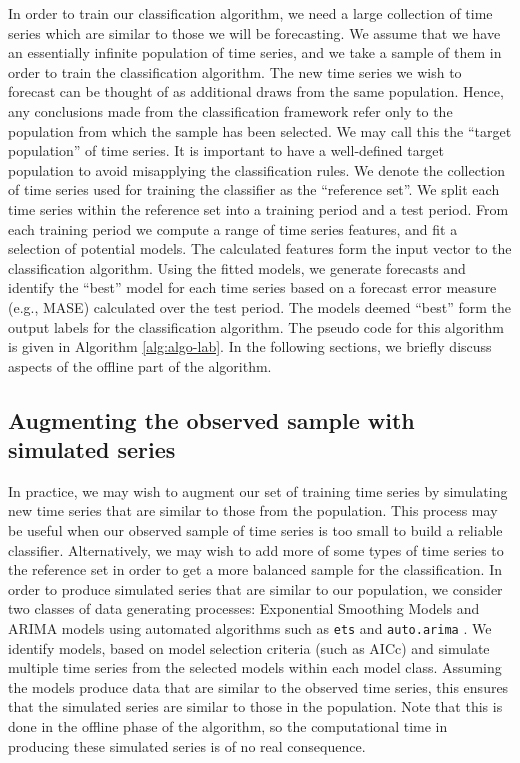 \documentclass[11pt,a4paper,]{article}
\theoremstyle{definition}
\theoremstyle{definition}
\theoremstyle{definition}
\theoremstyle{remark}
\begin{document}
In order to train our classification algorithm, we need a large
collection of time series which are similar to those we will be
forecasting. We assume that we have an essentially infinite population
of time series, and we take a sample of them in order to train the
classification algorithm. The new time series we wish to forecast can be
thought of as additional draws from the same population. Hence, any
conclusions made from the classification framework refer only to the
population from which the sample has been selected. We may call this the
``target population'' of time series. It is important to have a
well-defined target population to avoid misapplying the classification
rules. We denote the collection of time series used for training the
classifier as the ``reference set''. We split each time series within
the reference set into a training period and a test period. From each
training period we compute a range of time series features, and fit a
selection of potential models. The calculated features form the input
vector to the classification algorithm. Using the fitted models, we
generate forecasts and identify the ``best'' model for each time series
based on a forecast error measure (e.g., MASE) calculated over the test
period. The models deemed ``best'' form the output labels for the
classification algorithm. The pseudo code for this algorithm is given in
Algorithm \autoref{alg:algo-lab}. In the following sections, we briefly
discuss aspects of the offline part of the algorithm.

\subsection{Augmenting the observed sample with simulated
series}\label{augmenting-the-observed-sample-with-simulated-series}

In practice, we may wish to augment our set of training time series by
simulating new time series that are similar to those from the
population. This process may be useful when our observed sample of time
series is too small to build a reliable classifier. Alternatively, we
may wish to add more of some types of time series to the reference set
in order to get a more balanced sample for the classification. In order
to produce simulated series that are similar to our population, we
consider two classes of data generating processes: Exponential Smoothing
Models and ARIMA models using automated algorithms such as \texttt{ets}
and \texttt{auto.arima} \autocite{forecast}. We identify models, based
on model selection criteria (such as AICc) and simulate multiple time
series from the selected models within each model class. Assuming the
models produce data that are similar to the observed time series, this
ensures that the simulated series are similar to those in the
population. Note that this is done in the offline phase of the
algorithm, so the computational time in producing these simulated series
is of no real consequence.
\end{document}
